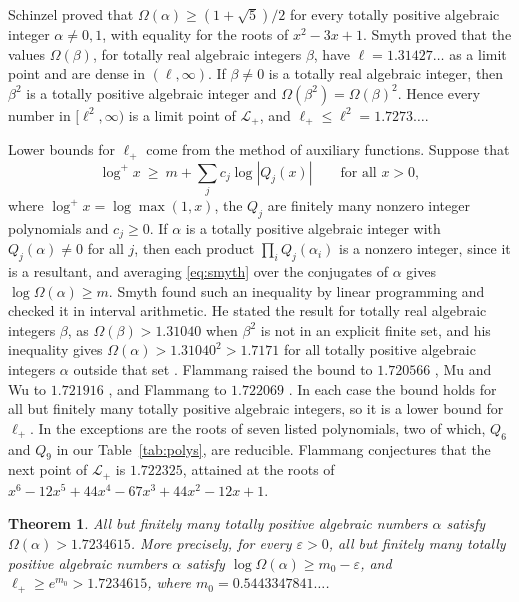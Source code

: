 \documentclass[11pt]{amsart}
\newtheorem{theorem}{Theorem}[section]
\theoremstyle{remark}
\numberwithin{equation}{section}
\newcommand{\logp}{\log^{+}}
\newcommand{\MzeroDec}{0.5443347841}
\newcommand{\EMzero}{1.7234615}
\newcommand{\SmyVal}{1.7171}
\newcommand{\FlamNinetySix}{1.720566}
\newcommand{\MuWuVal}{1.721916}
\newcommand{\FlamVal}{1.722069}
\newcommand{\SmyEll}{1.31427}
\newcommand{\SmyEllSq}{1.7273}
\begin{document}
Schinzel \cite{Sch73} proved that $\Omega(\alpha)\ge(1+\sqrt5)/2$ for every totally positive algebraic integer $\alpha\ne0,1$, with equality for the roots of $x^2-3x+1$. Smyth \cite[Theorems~1 and~2]{Smy80} proved that the values $\Omega(\beta)$, for totally real algebraic integers $\beta$, have $\ell=\SmyEll\ldots$ as a limit point and are dense in $(\ell,\infty)$. If $\beta\ne0$ is a totally real algebraic integer, then $\beta^2$ is a totally positive algebraic integer and $\Omega(\beta^2)=\Omega(\beta)^2$. Hence every number in $[\ell^2,\infty)$ is a limit point of $\mathcal L_+$, and $\ell_+\le\ell^2=\SmyEllSq\ldots$.

Lower bounds for $\ell_+$ come from the method of auxiliary functions. Suppose that
\begin{equation}\label{eq:smyth}
\logp x\ \ge\ m+\sum_{j}c_j\log|Q_j(x)|\qquad\text{for all }x>0,
\end{equation}
where $\logp x=\log\max(1,x)$, the $Q_j$ are finitely many nonzero integer polynomials and $c_j\ge0$. If $\alpha$ is a totally positive algebraic integer with $Q_j(\alpha)\ne0$ for all $j$, then each product $\prod_iQ_j(\alpha_i)$ is a nonzero integer, since it is a resultant, and averaging \eqref{eq:smyth} over the conjugates of $\alpha$ gives $\log\Omega(\alpha)\ge m$. Smyth \cite{Smy81} found such an inequality by linear programming and checked it in interval arithmetic. He stated the result for totally real algebraic integers $\beta$, as $\Omega(\beta)>1.31040$ when $\beta^2$ is not in an explicit finite set, and his inequality gives $\Omega(\alpha)>1.31040^2>\SmyVal$ for all totally positive algebraic integers $\alpha$ outside that set \cite[(6) and (9)]{Smy81}. Flammang raised the bound to $\FlamNinetySix$ \cite{Fla96}, Mu and Wu to $\MuWuVal$ \cite{MW13}, and Flammang to $\FlamVal$ \cite[Theorem~1]{Fla15}. In each case the bound holds for all but finitely many totally positive algebraic integers, so it is a lower bound for $\ell_+$. In \cite{Fla15} the exceptions are the roots of seven listed polynomials, two of which, $Q_6$ and $Q_9$ in our Table~\ref{tab:polys}, are reducible. Flammang conjectures that the next point of $\mathcal L_+$ is $1.722325$, attained at the roots of $x^6-12x^5+44x^4-67x^3+44x^2-12x+1$.

\begin{theorem}\label{thm:main}
All but finitely many totally positive algebraic numbers $\alpha$ satisfy $\Omega(\alpha)>\EMzero$. More precisely, for every $\varepsilon>0$, all but finitely many totally positive algebraic numbers $\alpha$ satisfy $\log\Omega(\alpha)\ge m_0-\varepsilon$, and $\ell_+\ge e^{m_0}>\EMzero$, where $m_0=\MzeroDec\ldots$.
\end{theorem}
\end{document}

